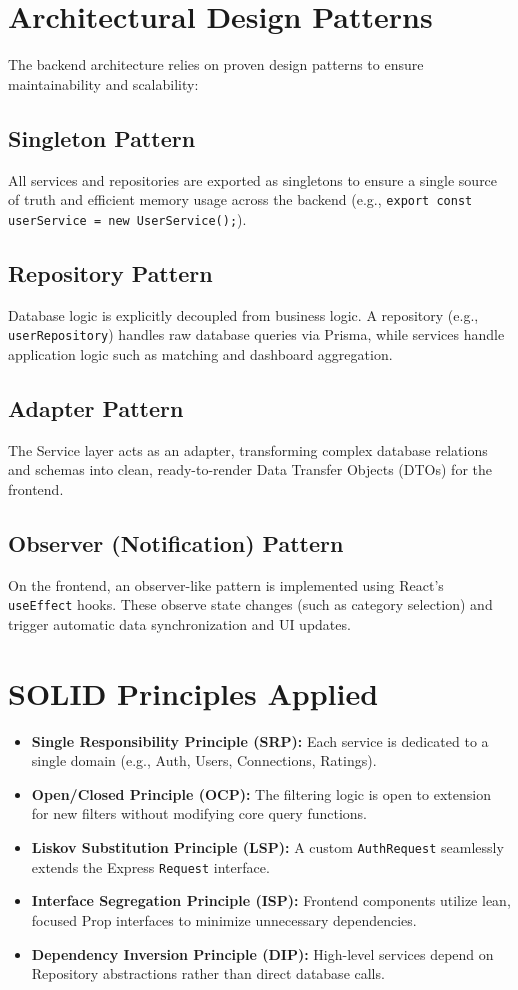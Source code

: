 \documentclass[12pt,a4paper]{article}
\begin{document}
\section{Architectural Design Patterns}
The backend architecture relies on proven design patterns to ensure maintainability and scalability:

\subsection{Singleton Pattern}
All services and repositories are exported as singletons to ensure a single source of truth and efficient memory usage across the backend (e.g., \texttt{export const userService = new UserService();}).

\subsection{Repository Pattern}
Database logic is explicitly decoupled from business logic. A repository (e.g., \texttt{userRepository}) handles raw database queries via Prisma, while services handle application logic such as matching and dashboard aggregation.

\subsection{Adapter Pattern}
The Service layer acts as an adapter, transforming complex database relations and schemas into clean, ready-to-render Data Transfer Objects (DTOs) for the frontend.

\subsection{Observer (Notification) Pattern}
On the frontend, an observer-like pattern is implemented using React's \texttt{useEffect} hooks. These observe state changes (such as category selection) and trigger automatic data synchronization and UI updates.

\section{SOLID Principles Applied}
\begin{itemize}
    \item \textbf{Single Responsibility Principle (SRP):} Each service is dedicated to a single domain (e.g., Auth, Users, Connections, Ratings).
    \item \textbf{Open/Closed Principle (OCP):} The filtering logic is open to extension for new filters without modifying core query functions.
    \item \textbf{Liskov Substitution Principle (LSP):} A custom \texttt{AuthRequest} seamlessly extends the Express \texttt{Request} interface.
    \item \textbf{Interface Segregation Principle (ISP):} Frontend components utilize lean, focused Prop interfaces to minimize unnecessary dependencies.
    \item \textbf{Dependency Inversion Principle (DIP):} High-level services depend on Repository abstractions rather than direct database calls.
\end{itemize}
\end{document}
